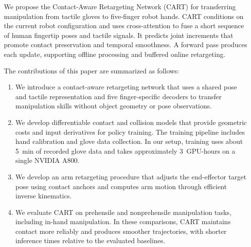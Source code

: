 We propose the Contact-Aware Retargeting Network (CART) for transferring manipulation from tactile gloves to five-finger robot hands. CART conditions on the current robot configuration and uses cross-attention to fuse a short sequence of human fingertip poses and tactile signals. It predicts joint increments that promote contact preservation and temporal smoothness. A forward pass produces each update, supporting offline processing and buffered online retargeting.

The contributions of this paper are summarized as follows:
\begin{enumerate}
    \item We introduce a contact-aware retargeting network that uses a shared pose and tactile representation and five finger-specific decoders to transfer manipulation skills without object geometry or pose observations.
    \item We develop differentiable contact and collision models that provide geometric costs and input derivatives for policy training. The training pipeline includes hand calibration and glove data collection. In our setup, training uses about 5~min of recorded glove data and takes approximately 3~GPU-hours on a single NVIDIA A800.
    \item We develop an arm retargeting procedure that adjusts the end-effector target pose using contact anchors and computes arm motion through efficient inverse kinematics.
    \item We evaluate CART on prehensile and nonprehensile manipulation tasks, including in-hand manipulation. In these comparisons, CART maintains contact more reliably and produces smoother trajectories, with shorter inference times relative to the evaluated baselines.
\end{enumerate}
